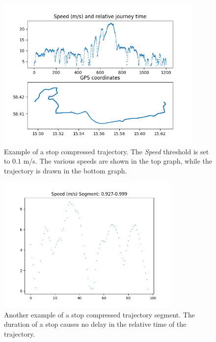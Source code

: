 \begin{figure}[h!]
    \centering
    \includegraphics[width=0.9\textwidth]{figures/time_and_speed}
    \caption[Example of a stop compressed trajectory]
    {\small Example of a stop compressed trajectory.
    The \textit{Speed} threshold is set to $0.1$ m/s.
    The various speeds are shown in the top graph, while the trajectory is drawn in the bottom graph.}
    \label{fig:time-and-speed}
\end{figure}

\begin{figure}[h!]
    \centering
    \includegraphics[width=0.8\textwidth]{figures/time_and_speed_segment}
    \caption[Another example of a stop compressed trajectory segment]
    {\small Another example of a stop compressed trajectory segment.
    The duration of a stop causes no delay in the relative time of the trajectory.}
    \label{fig:time-and-speed-segment}
\end{figure}


